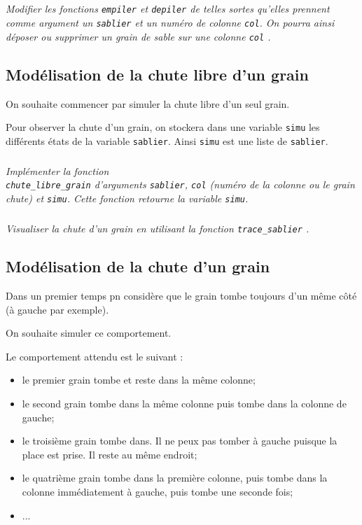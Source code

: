 \documentclass[10pt,fleqn]{article} %
\begin{document}
\begin{multicols}{2}
\subparagraph{}\textit{Modifier les fonctions \texttt{empiler} et \texttt{depiler} de telles sortes qu'elles prennent comme argument un \texttt{sablier} et un numéro de colonne \texttt{col}. On pourra ainsi déposer ou supprimer un grain de sable sur une colonne \texttt{col} .}

\subsection*{Modélisation de la chute libre d'un grain}

\begin{obj}
On souhaite commencer par simuler la chute libre d'un seul grain.
\end{obj}

Pour observer la chute d'un grain, on stockera dans une variable \texttt{simu} les différents états de la variable \texttt{sablier}. Ainsi \texttt{simu} est une liste de \texttt{sablier}.

\subparagraph{}\textit{Implémenter la fonction \\ \texttt{chute\_libre\_grain} d'arguments \texttt{sablier}, \texttt{col} (numéro de la colonne ou le grain chute) et \texttt{simu}. Cette fonction retourne la variable \texttt{simu}. }

\newpage

\subparagraph{}\textit{Visualiser la chute d'un grain en utilisant la fonction \texttt{trace\_sablier} . }


\subsection*{Modélisation de la chute d'un grain}
\begin{obj}
Dans un premier temps pn considère que le grain tombe toujours d'un même côté (à gauche par exemple). 

On souhaite simuler ce comportement. 
\end{obj}


Le comportement attendu est le suivant : 
\begin{itemize}
\item le premier grain tombe et reste dans la même colonne;
\item le second grain tombe dans la même colonne puis tombe dans la colonne de gauche;
\item le troisième grain tombe dans. Il ne peux pas tomber à gauche puisque la place est prise. Il reste au même endroit;
\item le quatrième grain tombe dans la première colonne, puis tombe dans la colonne immédiatement à gauche, puis tombe une seconde fois;
\item ...
\end{itemize}



\end{multicols}
\end{document}
